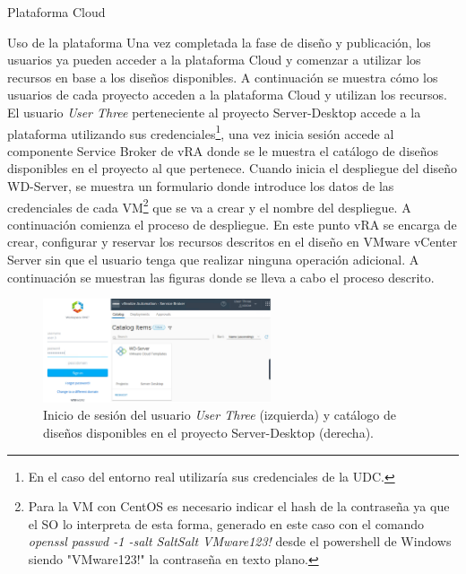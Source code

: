 \begin{subsection}{Plataforma Cloud}
\begin{subsubsection}{Uso de la plataforma}
        Una vez completada la fase de diseño y publicación, los usuarios ya pueden acceder a la plataforma Cloud y comenzar a utilizar los recursos en base a los diseños disponibles. A continuación se muestra cómo los usuarios de cada proyecto acceden a la plataforma Cloud y utilizan los recursos. 
        El usuario \textit{User Three} perteneciente al proyecto Server-Desktop accede a la plataforma utilizando sus credenciales\footnote{En el caso del entorno real utilizaría sus credenciales de la UDC.}, una vez inicia sesión accede al componente Service Broker de vRA donde se le muestra el catálogo de diseños disponibles en el proyecto al que pertenece. Cuando inicia el despliegue del diseño WD-Server, se muestra un formulario donde introduce los datos de las credenciales de cada VM\footnote{Para la VM con CentOS es necesario indicar el hash de la contraseña ya que el SO lo interpreta de esta forma, generado en este caso con el comando \textit{openssl passwd -1 -salt SaltSalt VMware123!} desde el powershell de Windows siendo "VMware123!" la contraseña en texto plano.} que se va a crear y el nombre del despliegue. A continuación comienza el proceso de despliegue. En este punto vRA se encarga de crear, configurar y reservar los recursos descritos en el diseño en VMware vCenter Server sin que el usuario tenga que realizar ninguna operación adicional. A continuación se muestran las figuras donde se lleva a cabo el proceso descrito.
        \begin{figure}[h]
            \centering
            \includegraphics[width=0.6\textwidth]{imaxes/pruebaconcepto/vrealize/login-user-3-credentials.png}
            \caption{Inicio de sesión del usuario \textit{User Three} (izquierda) y catálogo de diseños disponibles en el proyecto Server-Desktop (derecha).}
            \label{fig:login-user-3-catalog}
        \end{figure}
        \FloatBarrier
        \begin{figure}[h]
            \centering

\end{figure}
\end{subsubsection}
\end{subsection}
